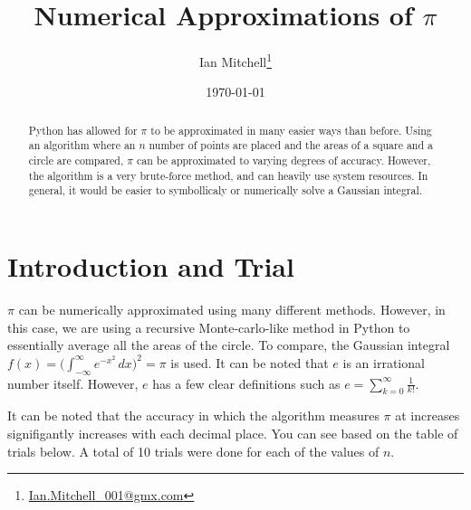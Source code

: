 \documentclass[12pt]{article}
\title{Numerical Approximations of $\pi$}
\author{Ian Mitchell\footnote{\url{Ian.Mitchell_001@gmx.com}}}
\date{\today}
\begin{document}
    
    
    \maketitle
    
    

    


\begin{abstract}
Python has allowed for \(\pi\) to be approximated in many easier ways than before. Using an algorithm where an \(n\) number of points are placed and the areas of a square and a circle are compared, \(\pi\) can be approximated to varying degrees of accuracy. However, the algorithm is a very brute-force method, and can heavily use system resources. In general, it would be easier to symbollicaly or numerically solve a Gaussian integral.
\end{abstract}


\section{Introduction and Trial}

\(\pi\) can be numerically approximated using many different methods. However, in this case, we are using a recursive Monte-carlo-like method in Python to essentially average all the areas of the circle. To compare, the Gaussian integral \(f(x) = \big(\int_{-\infty}^\infty e^{-x^2}\,dx\big)^2 = \pi\) is used. It can be noted that \(e\) is an irrational number itself. However, \(e\) has a few clear definitions such as \(e = \sum_{k = 0}^{\infty} \frac{1}{k!}\).

It can be noted that the accuracy in which the algorithm measures \(\pi\) at increases signifigantly increases with each decimal place. You can see based on the table of trials below. A total of 10 trials were done for each of the values of \(n\).
\end{document}
